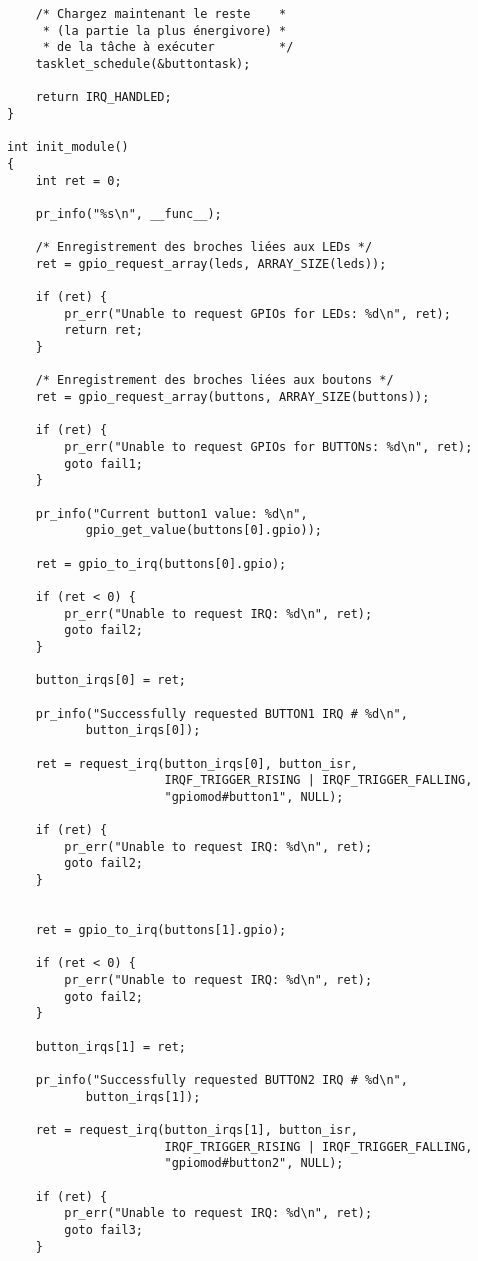 \documentclass[11pt]{article}
\begin{document}
\begin{verbatim}
    /* Chargez maintenant le reste    *
     * (la partie la plus énergivore) *
     * de la tâche à exécuter         */
    tasklet_schedule(&buttontask);

    return IRQ_HANDLED;
}

int init_module()
{
    int ret = 0;

    pr_info("%s\n", __func__);

    /* Enregistrement des broches liées aux LEDs */
    ret = gpio_request_array(leds, ARRAY_SIZE(leds));

    if (ret) {
        pr_err("Unable to request GPIOs for LEDs: %d\n", ret);
        return ret;
    }

    /* Enregistrement des broches liées aux boutons */
    ret = gpio_request_array(buttons, ARRAY_SIZE(buttons));

    if (ret) {
        pr_err("Unable to request GPIOs for BUTTONs: %d\n", ret);
        goto fail1;
    }

    pr_info("Current button1 value: %d\n",
           gpio_get_value(buttons[0].gpio));

    ret = gpio_to_irq(buttons[0].gpio);

    if (ret < 0) {
        pr_err("Unable to request IRQ: %d\n", ret);
        goto fail2;
    }

    button_irqs[0] = ret;

    pr_info("Successfully requested BUTTON1 IRQ # %d\n",
           button_irqs[0]);

    ret = request_irq(button_irqs[0], button_isr,
                      IRQF_TRIGGER_RISING | IRQF_TRIGGER_FALLING,
                      "gpiomod#button1", NULL);

    if (ret) {
        pr_err("Unable to request IRQ: %d\n", ret);
        goto fail2;
    }


    ret = gpio_to_irq(buttons[1].gpio);

    if (ret < 0) {
        pr_err("Unable to request IRQ: %d\n", ret);
        goto fail2;
    }

    button_irqs[1] = ret;

    pr_info("Successfully requested BUTTON2 IRQ # %d\n",
           button_irqs[1]);

    ret = request_irq(button_irqs[1], button_isr,
                      IRQF_TRIGGER_RISING | IRQF_TRIGGER_FALLING,
                      "gpiomod#button2", NULL);

    if (ret) {
        pr_err("Unable to request IRQ: %d\n", ret);
        goto fail3;
    }


\end{verbatim}
\end{document}

